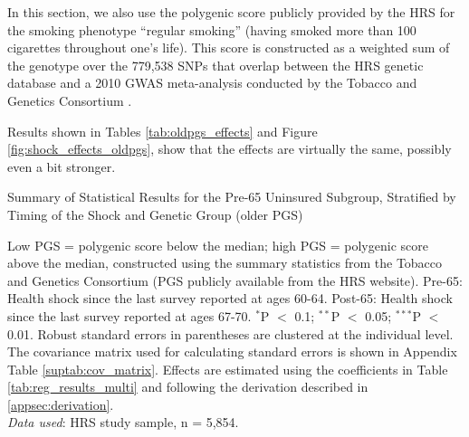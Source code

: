 In this section, we also use the polygenic score publicly provided by the HRS \citep{HRSPGenscore2017} for the smoking phenotype ``regular smoking'' (having smoked more than 100 cigarettes throughout one's life).
This score is constructed as a weighted sum of the genotype over the 779,538 SNPs that overlap between the HRS genetic database and a 2010 GWAS meta-analysis conducted by the Tobacco and Genetics Consortium \citep{TAG2010}.

Results shown in Tables \ref{tab:oldpgs_effects} and Figure \ref{fig:shock_effects_oldpgs}, show that the effects are virtually the same, possibly even a bit stronger.

\begin{table}[!ht]
	\caption{Summary of Statistical Results for the Pre-65 Uninsured Subgroup, Stratified by Timing of the Shock and Genetic Group (older PGS)}
	\label{tab:oldpgs_effects}
	
		\begin{flushleft}
			Low PGS = polygenic score below the median; high PGS = polygenic score above the median, constructed using the summary statistics from the Tobacco and Genetics Consortium \citep{TAG2010} (PGS publicly available from the HRS website).
			Pre-65: Health shock since the last survey reported at ages 60-64.
			Post-65: Health shock since the last survey reported at ages 67-70.
			$^{*}$P $<$ 0.1; $^{**}$P $<$ 0.05; $^{***}$P $<$ 0.01. Robust standard errors in parentheses are clustered at the individual level.
			The covariance matrix used for calculating standard errors is shown in Appendix Table \ref{suptab:cov_matrix}.
			Effects are estimated using the coefficients in Table \ref{tab:reg_results_multi} and following the derivation described in \ref{appsec:derivation}.\\
			\textit{Data used}: HRS study sample, n = 5,854.
		\end{flushleft}
\end{table}




